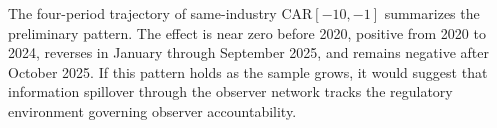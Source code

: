 The four-period trajectory of same-industry CAR$[-10,-1]$ summarizes the preliminary pattern. The effect is near zero before 2020, positive from 2020 to 2024, reverses in January through September 2025, and remains negative after October 2025. If this pattern holds as the sample grows, it would suggest that information spillover through the observer network tracks the regulatory environment governing observer accountability.
